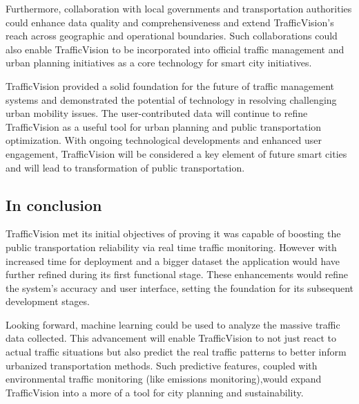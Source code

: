 Furthermore, collaboration with local governments and transportation authorities could enhance data quality and comprehensiveness and extend TrafficVision's reach across geographic and operational boundaries. Such collaborations could also enable TrafficVision to be incorporated into official traffic management and urban planning initiatives as a core technology for smart city initiatives.

TrafficVision provided a solid foundation for the future of traffic management systems and demonstrated the potential of technology in resolving challenging urban mobility issues. The user-contributed data will continue to refine TrafficVision as a useful tool for urban planning and public transportation optimization. With ongoing technological developments and enhanced user engagement, TrafficVision will be considered a key element of future smart cities and will lead to transformation of public transportation.

\subsection{In conclusion}
TrafficVision met its initial objectives of proving it was capable of boosting the public transportation reliability via real time traffic monitoring. However with increased time for deployment and a bigger dataset the application would have further refined during its first functional stage. These enhancements would refine the system's accuracy and user interface, setting the foundation for its subsequent development stages.

Looking forward, machine learning could be used to analyze the massive traffic data collected. This advancement will enable TrafficVision to not just react to actual traffic situations but also predict the real traffic patterns to better inform urbanized transportation methods. Such predictive features, coupled with environmental traffic monitoring (like emissions monitoring),would expand TrafficVision into a more of a tool for city planning and sustainability.